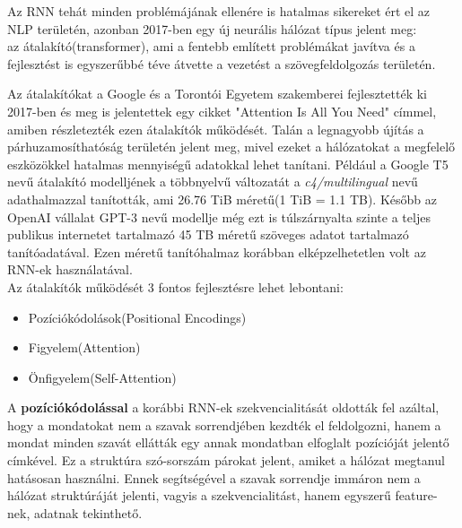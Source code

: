Az RNN tehát minden problémájának ellenére is hatalmas sikereket ért el az NLP területén, azonban 2017-ben egy új neurális hálózat típus jelent meg:\\
az átalakító(transformer), ami a fentebb említett problémákat javítva és a fejlesztést is egyszerűbbé téve átvette a vezetést a szövegfeldolgozás területén.

Az átalakítókat a Google és a Torontói Egyetem szakemberei fejlesztették ki 2017-ben és meg is jelentettek egy cikket "Attention Is All You Need"\cite{attention} címmel, amiben részletezték ezen átalakítók működését. Talán a legnagyobb újítás a párhuzamosíthatóság területén jelent meg, mivel ezeket a hálózatokat a megfelelő eszközökkel hatalmas mennyiségű adatokkal lehet tanítani. Például a Google T5 nevű átalakító modelljének a többnyelvű változatát a \textit{c4/multilingual} nevű adathalmazzal tanították, ami 26.76 TiB méretű(1 TiB = 1.1 TB). Később az OpenAI vállalat GPT-3 nevű modellje még ezt is túlszárnyalta szinte a teljes publikus internetet tartalmazó 45 TB méretű szöveges adatot tartalmazó tanítóadatával. Ezen méretű tanítóhalmaz korábban elképzelhetetlen volt az RNN-ek használatával.\\
Az átalakítók működését 3 fontos fejlesztésre lehet lebontani:

\begin{itemize}
\item Pozíciókódolások(Positional Encodings)
\item Figyelem(Attention)
\item Önfigyelem(Self-Attention)
\end{itemize}

A \textbf{pozíciókódolással} a korábbi RNN-ek szekvencialitását oldották fel azáltal, hogy a mondatokat nem a szavak sorrendjében kezdték el feldolgozni, hanem a mondat minden szavát ellátták egy annak mondatban elfoglalt pozícióját jelentő címkével. Ez a struktúra szó-sorszám párokat jelent, amiket a hálózat megtanul hatásosan használni. Ennek segítségével a szavak sorrendje immáron nem a hálózat struktúráját jelenti, vagyis a szekvencialitást, hanem egyszerű feature-nek, adatnak tekinthető.

